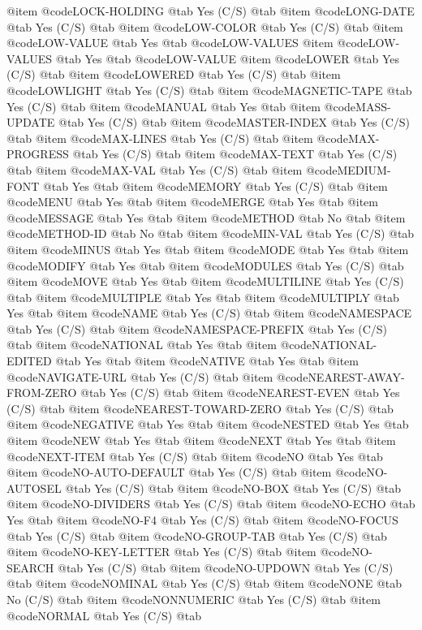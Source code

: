 @item @code{LOCK-HOLDING} @tab Yes	(C/S) @tab 
@item @code{LONG-DATE} @tab Yes	(C/S) @tab 
@item @code{LOW-COLOR} @tab Yes	(C/S) @tab 
@item @code{LOW-VALUE} @tab Yes @tab @code{LOW-VALUES}
@item @code{LOW-VALUES} @tab Yes @tab @code{LOW-VALUE}
@item @code{LOWER} @tab Yes	(C/S) @tab 
@item @code{LOWERED} @tab Yes	(C/S) @tab 
@item @code{LOWLIGHT} @tab Yes	(C/S) @tab 
@item @code{MAGNETIC-TAPE} @tab Yes	(C/S) @tab 
@item @code{MANUAL} @tab Yes @tab 
@item @code{MASS-UPDATE} @tab Yes	(C/S) @tab 
@item @code{MASTER-INDEX} @tab Yes	(C/S) @tab 
@item @code{MAX-LINES} @tab Yes	(C/S) @tab 
@item @code{MAX-PROGRESS} @tab Yes	(C/S) @tab 
@item @code{MAX-TEXT} @tab Yes	(C/S) @tab 
@item @code{MAX-VAL} @tab Yes	(C/S) @tab 
@item @code{MEDIUM-FONT} @tab Yes @tab 
@item @code{MEMORY} @tab Yes	(C/S) @tab 
@item @code{MENU} @tab Yes @tab 
@item @code{MERGE} @tab Yes @tab 
@item @code{MESSAGE} @tab Yes @tab 
@item @code{METHOD} @tab No @tab 
@item @code{METHOD-ID} @tab No @tab 
@item @code{MIN-VAL} @tab Yes	(C/S) @tab 
@item @code{MINUS} @tab Yes @tab 
@item @code{MODE} @tab Yes @tab 
@item @code{MODIFY} @tab Yes @tab 
@item @code{MODULES} @tab Yes	(C/S) @tab 
@item @code{MOVE} @tab Yes @tab 
@item @code{MULTILINE} @tab Yes	(C/S) @tab 
@item @code{MULTIPLE} @tab Yes @tab 
@item @code{MULTIPLY} @tab Yes @tab 
@item @code{NAME} @tab Yes	(C/S) @tab 
@item @code{NAMESPACE} @tab Yes	(C/S) @tab 
@item @code{NAMESPACE-PREFIX} @tab Yes	(C/S) @tab 
@item @code{NATIONAL} @tab Yes @tab 
@item @code{NATIONAL-EDITED} @tab Yes @tab 
@item @code{NATIVE} @tab Yes @tab 
@item @code{NAVIGATE-URL} @tab Yes	(C/S) @tab 
@item @code{NEAREST-AWAY-FROM-ZERO} @tab Yes	(C/S) @tab 
@item @code{NEAREST-EVEN} @tab Yes	(C/S) @tab 
@item @code{NEAREST-TOWARD-ZERO} @tab Yes	(C/S) @tab 
@item @code{NEGATIVE} @tab Yes @tab 
@item @code{NESTED} @tab Yes @tab 
@item @code{NEW} @tab Yes @tab 
@item @code{NEXT} @tab Yes @tab 
@item @code{NEXT-ITEM} @tab Yes	(C/S) @tab 
@item @code{NO} @tab Yes @tab 
@item @code{NO-AUTO-DEFAULT} @tab Yes	(C/S) @tab 
@item @code{NO-AUTOSEL} @tab Yes	(C/S) @tab 
@item @code{NO-BOX} @tab Yes	(C/S) @tab 
@item @code{NO-DIVIDERS} @tab Yes	(C/S) @tab 
@item @code{NO-ECHO} @tab Yes @tab 
@item @code{NO-F4} @tab Yes	(C/S) @tab 
@item @code{NO-FOCUS} @tab Yes	(C/S) @tab 
@item @code{NO-GROUP-TAB} @tab Yes	(C/S) @tab 
@item @code{NO-KEY-LETTER} @tab Yes	(C/S) @tab 
@item @code{NO-SEARCH} @tab Yes	(C/S) @tab 
@item @code{NO-UPDOWN} @tab Yes	(C/S) @tab 
@item @code{NOMINAL} @tab Yes	(C/S) @tab 
@item @code{NONE} @tab No	(C/S) @tab 
@item @code{NONNUMERIC} @tab Yes	(C/S) @tab 
@item @code{NORMAL} @tab Yes	(C/S) @tab 
